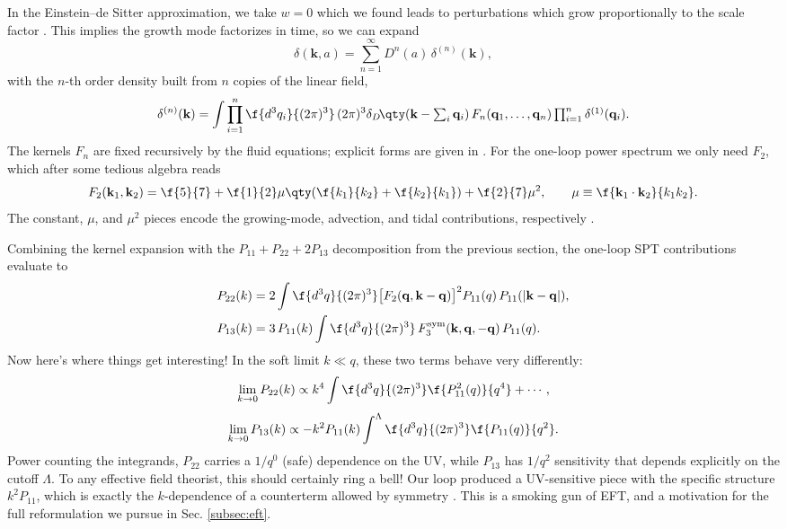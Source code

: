 In the Einstein--de Sitter approximation, we take $w=0$ which we found leads to perturbations which grow proportionally to the scale factor \citep{Bernardeau2002,Baldauf2020}. This implies the growth mode factorizes in 
time, so we can expand
\begin{equation}
    \delta(\mathbf{k},a)=\sum_{n=1}^{\infty}D^n(a)\,\delta^{(n)}(\mathbf{k}),
\end{equation}
with the $n$-th order density built from $n$ copies of the linear field,
\begin{equation}
    \delta^{(n)}(\mathbf{k})=
    \int\prod_{i=1}^{n}\f{d^3q_i}{(2\pi)^3}\,
    (2\pi)^3\delta_D\!\qty(\mathbf{k}-\textstyle\sum_i\mathbf{q}_i)\,
    F_n(\mathbf{q}_1,\ldots,\mathbf{q}_n)\prod_{i=1}^{n}\delta^{(1)}(\mathbf{q}_i).
\end{equation}
The kernels $F_n$ are fixed recursively by the fluid equations; explicit 
forms are given in \citep{Bernardeau2002}. For the one-loop power 
spectrum we only need $F_2$, which after some tedious algebra reads
\begin{equation}
    F_2(\mathbf{k}_1,\mathbf{k}_2)
    =\f{5}{7}
    +\f{1}{2}\mu\qty(\f{k_1}{k_2}+\f{k_2}{k_1})
    +\f{2}{7}\mu^2,
    \qquad
    \mu\equiv\f{\mathbf{k}_1\cdot\mathbf{k}_2}{k_1 k_2}.
\end{equation}
The constant, $\mu$, and $\mu^2$ pieces encode the growing-mode, 
advection, and tidal contributions, respectively 
\citep{Bernardeau2002,Baldauf2020}.

Combining the kernel expansion with the $P_{11}+P_{22}+2P_{13}$ 
decomposition from the previous section, the one-loop SPT contributions 
evaluate to
\begin{align}
    P_{22}(k)&=
    2\int\f{d^3q}{(2\pi)^3}
    \bigl[F_2(\mathbf{q},\mathbf{k}-\mathbf{q})\bigr]^2
    P_{11}(q)\,P_{11}(|\mathbf{k}-\mathbf{q}|),\\
    P_{13}(k)&=
    3\,P_{11}(k)\int\f{d^3q}{(2\pi)^3}\,
    F_3^{\rm sym}(\mathbf{k},\mathbf{q},-\mathbf{q})\,P_{11}(q).
\end{align}
Now here's where things get interesting! In the soft limit $k\ll q$, these two terms behave very differently:
\begin{equation}
    \label{eq:softp22limit}
    \lim_{k\to 0}P_{22}(k)\propto
    k^4\int\f{d^3q}{(2\pi)^3}\f{P_{11}^2(q)}{q^4}+\cdots,
\end{equation}
\begin{equation}
    \label{eq:softp13limit}
    \lim_{k\to 0}P_{13}(k)\propto
    -k^2P_{11}(k)\int^{\Lambda}\f{d^3q}{(2\pi)^3}\f{P_{11}(q)}{q^2}.
\end{equation}
Power counting the integrands, $P_{22}$ carries a $1/q^0$ (safe) 
dependence on the UV, while $P_{13}$ has $1/q^2$ sensitivity that depends 
explicitly on the cutoff $\Lambda$. To any effective field theorist, this should certainly ring a bell! Our loop produced a UV-sensitive piece with the 
specific structure $k^2P_{11}$, which is exactly the $k$-dependence of a 
counterterm allowed by symmetry
\citep{CarrascoEtAl2012,PajerZaldarriaga2013}. This is a smoking gun of EFT, and a motivation for the full reformulation we pursue in  Sec. \ref{subsec:eft}.

